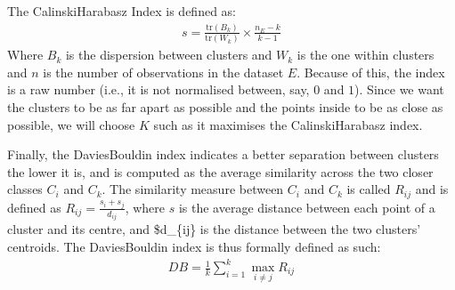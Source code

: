 \documentclass[letterpaper,10pt,english]{jupyterBook}
\begin{document}
\sphinxAtStartPar
The Calinski\sphinxhyphen{}Harabasz Index is defined as:
\begin{equation*}
\begin{split}
s = \frac{\mathrm{tr}(B_k)}{\mathrm{tr}(W_k)} \times \frac{n_E - k}{k - 1}
\end{split}
\end{equation*}
\sphinxAtStartPar
Where \(B_k\) is the dispersion between clusters and \(W_k\) is the one within clusters and \(n\) is the number of observations in the dataset \(E\). Because of this, the index is a raw number (i.e., it is not normalised between, say, \(0\) and \(1\)). Since we want the clusters to be as far apart as possible and the points inside to be as close as possible, we will choose \(K\) such as it maximises the Calinski\sphinxhyphen{}Harabasz index.

\sphinxAtStartPar
Finally, the Davies\sphinxhyphen{}Bouldin index indicates a better separation between clusters the lower it is, and is computed as the average similarity across the two closer classes \(C_i\) and \(C_k\). The similarity measure between \(C_i\) and \(C_k\) is called \(R_{ij}\) and is defined as \(R_{ij} = \frac{s_i + s_j}{d_{ij}}\), where \(s\) is the average distance between each point of a cluster and its centre, and \$d\_\{ij\} is the distance between the two clusters’ centroids. The Davies\sphinxhyphen{}Bouldin index is thus formally defined as such:
\begin{equation*}
\begin{split}
DB = \frac{1}{k} \sum_{i=1}^k \max_{i \neq j} R_{ij}
\end{split}
\end{equation*}
\end{document}

